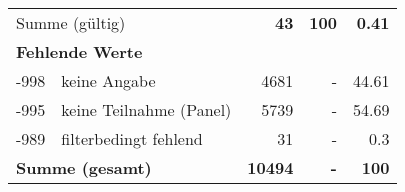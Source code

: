 \begin{longtable}{lXrrr}
     \midrule
     \multicolumn{2}{l}{Summe (gültig)} &
       \textbf{\num{43}} &
     \textbf{100} &
       \textbf{\num[round-mode=places,round-precision=2]{0,41}} \\
     \multicolumn{5}{l}{\textbf{Fehlende Werte}}\\
       -998 &
       keine Angabe &
         \num{4681} &
        - &
         \num[round-mode=places,round-precision=2]{44,61} \\
       -995 &
       keine Teilnahme (Panel) &
         \num{5739} &
        - &
         \num[round-mode=places,round-precision=2]{54,69} \\
       -989 &
       filterbedingt fehlend &
         \num{31} &
        - &
         \num[round-mode=places,round-precision=2]{0,3} \\
     \midrule
     \multicolumn{2}{l}{\textbf{Summe (gesamt)}} &
          \textbf{\num{10494}} &
        \textbf{-} &
        \textbf{100} \\
     \bottomrule
     \end{longtable}
     
